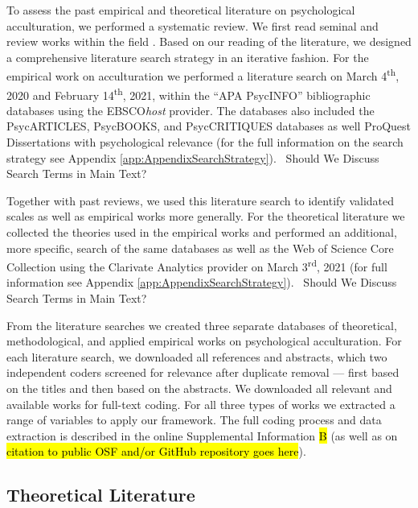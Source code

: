 \newcommand{\nTheo}{92}
\newcommand{\nMeth}{221}
\newcommand{\nEmp}{526}

To assess the past empirical and theoretical literature on psychological
acculturation, we performed a systematic review. We first read seminal
and review works within the field
\citep[including,][]{Ward2019, Berry1997b, Berry2003, Szapocznik1978, Sam2006a, Rudmin2003a}.
Based on our reading of the literature, we designed a comprehensive
literature search strategy in an iterative fashion. For the empirical
work on acculturation we performed a literature search on March
4\textsuperscript{th}, 2020 and February 14\textsuperscript{th}, 2021,
within the ``APA PsycINFO'' bibliographic databases using the
EBSCO\textit{host} provider. The databases also included the
PsycARTICLES, PsycBOOKS, and PsycCRITIQUES databases as well ProQuest
Dissertations with psychological relevance (for the full information on
the search strategy see Appendix \ref{app:AppendixSearchStrategy}).
\Warning~Should We Discuss Search Terms in Main Text? \Warning

Together with past reviews, we used this literature search to identify
validated scales as well as empirical works more generally. For the
theoretical literature we collected the theories used in the empirical
works and performed an additional, more specific, search of the same
databases as well as the Web of Science Core Collection using the
Clarivate Analytics provider on March 3\textsuperscript{rd}, 2021 (for
full information see Appendix \ref{app:AppendixSearchStrategy}).
\Warning~Should We Discuss Search Terms in Main Text? \Warning~

From the literature searches we created three separate databases of
theoretical, methodological, and applied empirical works on
psychological acculturation. For each literature search, we downloaded
all references and abstracts, which two independent coders screened for
relevance after duplicate removal --- first based on the titles and then
based on the abstracts. We downloaded all relevant and available works
for full-text coding. For all three types of works we extracted a range
of variables to apply our framework. The full coding process and data
extraction is described in the online Supplemental Information \hl{B}
(as well as on
\hl{citation to public OSF and/or GitHub repository goes here}).

\subsection{Theoretical Literature}

